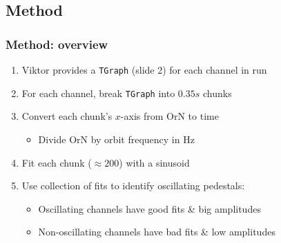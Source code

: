 \documentclass[bigger]{beamer}
\begin{document}
\subsection{Method}
\label{sec-2-1}
\begin{frame}
\frametitle{Method: overview}
\label{sec-2-1-1}

\begin{enumerate}
\item Viktor provides a \texttt{TGraph} (slide 2) for each channel in run
\item For each channel, break \texttt{TGraph} into $0.35 s$ chunks
\item Convert each chunk's $x$-axis from OrN to time
\begin{itemize}
\item Divide OrN by orbit frequency in Hz
\end{itemize}
\item Fit each chunk ($\approx 200$) with a sinusoid
\item Use collection of fits to identify oscillating pedestals:
\begin{itemize}
\item Oscillating channels have good fits \& big amplitudes
\item Non-oscillating channels have bad fits \& low amplitudes
\end{itemize}
\end{enumerate}
\end{frame}
\end{document}
